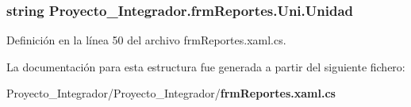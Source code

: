 \subsubsection[{Unidad}]{\setlength{\rightskip}{0pt plus 5cm}string Proyecto\-\_\-\-Integrador.\-frm\-Reportes.\-Uni.\-Unidad\hspace{0.3cm}{\ttfamily [get]}}\label{struct_proyecto___integrador_1_1frm_reportes_1_1_uni_adf79a555b10ff8ce7b30736e1adfb211}


Definición en la línea 50 del archivo frm\-Reportes.\-xaml.\-cs.



La documentación para esta estructura fue generada a partir del siguiente fichero\-:\begin{DoxyCompactItemize}
\item 
Proyecto\-\_\-\-Integrador/\-Proyecto\-\_\-\-Integrador/{\bf frm\-Reportes.\-xaml.\-cs}\end{DoxyCompactItemize}
